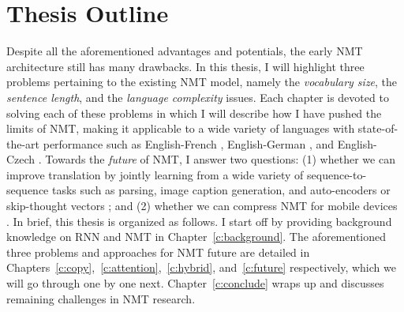 \section{Thesis Outline}
Despite all the aforementioned advantages and potentials, the early NMT architecture
\cite{sutskever14,cho14} still has many drawbacks. In this thesis, I will
highlight three problems pertaining to the existing NMT model, namely the
{\it vocabulary size}, the {\it sentence length}, and the {\it
language complexity} issues. Each chapter is devoted to solving each of these
problems in which I will describe how I have pushed the limits of NMT, making it
applicable to a wide variety of languages with state-of-the-art performance such as
English-French \cite{luong15}, English-German \cite{luong15attn,luong15iwslt}, and
English-Czech \cite{luong16}. Towards the {\it future} of
NMT, I answer two questions: (1) whether we can improve translation by jointly
learning from a wide variety of sequence-to-sequence tasks such as parsing,
image caption generation, and auto-encoders or skip-thought vectors
\cite{luong16iclr}; and (2)
whether we can compress NMT for mobile devices \cite{see16}.
In brief, this thesis is organized as follows. I start off by providing background knowledge on RNN and NMT
in Chapter~\ref{c:background}. 
The aforementioned three problems and approaches for NMT future are detailed in
Chapters~\ref{c:copy},~\ref{c:attention},~\ref{c:hybrid}, and~\ref{c:future}
respectively, which we will go through one by one next.
Chapter~\ref{c:conclude} wraps up and discusses remaining challenges in NMT research.

